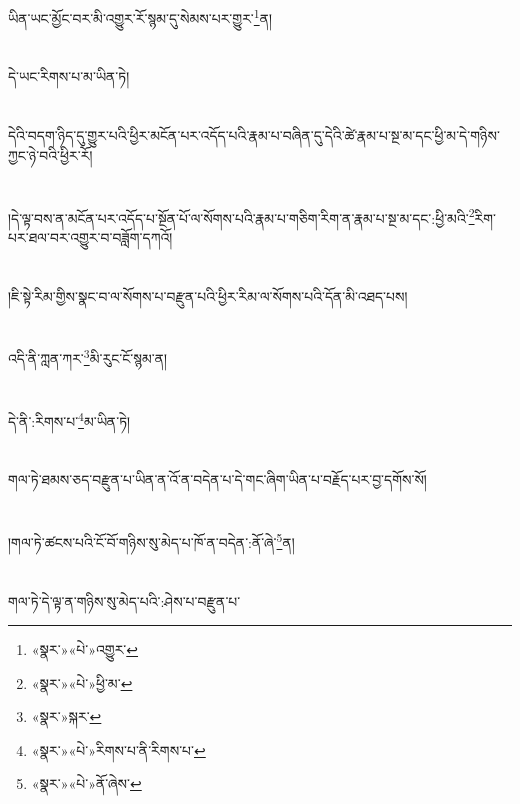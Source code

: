 ཡིན་ཡང་མྱོང་བར་མི་འགྱུར་རོ་སྙམ་དུ་སེམས་པར་གྱུར་\footnote{«སྣར་»«པེ་»འགྱུར་}ན།\chapter{ }དེ་ཡང་རིགས་པ་མ་ཡིན་ཏེ།\chapter{ }དེའི་བདག་ཉིད་དུ་གྱུར་པའི་ཕྱིར་མངོན་པར་འདོད་པའི་རྣམ་པ་བཞིན་དུ་དེའི་ཚེ་རྣམ་པ་སྔ་མ་དང་ཕྱི་མ་དེ་གཉིས་ཀྱང་ཉེ་བའི་ཕྱིར་རོ།\chapter{ }།དེ་ལྟ་བས་ན་མངོན་པར་འདོད་པ་སྔོན་པོ་ལ་སོགས་པའི་རྣམ་པ་གཅིག་རིག་ན་རྣམ་པ་སྔ་མ་དང་:ཕྱི་མའི་\footnote{«སྣར་»«པེ་»ཕྱི་མ་}རིག་པར་ཐལ་བར་འགྱུར་བ་བཟློག་དཀའོ།\chapter{ }།ཇི་སྟེ་རིམ་གྱིས་སྣང་བ་ལ་སོགས་པ་བརྫུན་པའི་ཕྱིར་རིམ་ལ་སོགས་པའི་དོན་མི་འཐད་པས།\chapter{ }འདི་ནི་ཀླན་ཀར་\footnote{«སྣར་»སྐར་}མི་རུང་ངོ་སྙམ་ན།\chapter{ }དེ་ནི་:རིགས་པ་\footnote{«སྣར་»«པེ་»རིགས་པ་ནི་རིགས་པ་}མ་ཡིན་ཏེ།\chapter{ }གལ་ཏེ་ཐམས་ཅད་བརྫུན་པ་ཡིན་ན་འོ་ན་བདེན་པ་དེ་གང་ཞིག་ཡིན་པ་བརྗོད་པར་བྱ་དགོས་སོ།\chapter{ }།གལ་ཏེ་ཚངས་པའི་ངོ་བོ་གཉིས་སུ་མེད་པ་ཁོ་ན་བདེན་:ནོ་ཞེ་\footnote{«སྣར་»«པེ་»ནོ་ཞེས་}ན།\chapter{ }གལ་ཏེ་དེ་ལྟ་ན་གཉིས་སུ་མེད་པའི་:ཤེས་པ་བརྫུན་པ་\foo
